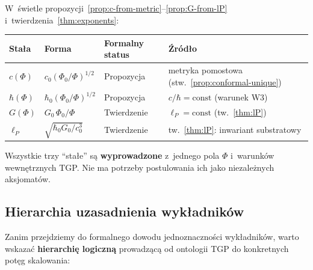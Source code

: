 \begin{remark}\label{rem:stalych-status}
W~\'swietle propozycji~\ref{prop:c-from-metric}--\ref{prop:G-from-lP}
i~twierdzenia~\ref{thm:exponents}:
\begin{center}\small
\begin{tabular}{@{}llll@{}}
\toprule
\textbf{Stała} & \textbf{Forma} & \textbf{Formalny status} & \textbf{Źródło} \\
\midrule
$c(\Phi)$ & $c_0(\Phi_0/\Phi)^{1/2}$ & Propozycja &
  metryka pomostowa (stw.~\ref{prop:conformal-unique}) \\
$\hbar(\Phi)$ & $\hbar_0(\Phi_0/\Phi)^{1/2}$ & Propozycja &
  $c/\hbar = \mathrm{const}$ (warunek W3) \\
$G(\Phi)$ & $G_0\,\Phi_0/\Phi$ & Twierdzenie &
  $\ell_P = \mathrm{const}$ (tw.~\ref{thm:lP}) \\
$\ell_P$ & $\sqrt{\hbar_0 G_0/c_0^3}$ & Twierdzenie &
  tw.~\ref{thm:lP}: inwariant substratowy \\
\bottomrule
\end{tabular}
\end{center}
Wszystkie trzy ``sta\l{}e'' s\k{a} \textbf{wyprowadzone} z~jednego pola $\Phi$
i~warunków wewn\k{e}trznych TGP. Nie ma potrzeby postulowania ich
jako niezale\.znych aksjomat\'ow.
\end{remark}

\subsection{Hierarchia uzasadnienia wyk\l{}adnik\'ow}\label{ssec:hierarchia-uzasad}

Zanim przejdziemy do formalnego dowodu jednoznaczno\'sci
wyk\l{}adnik\'ow, warto wskaza\'c \textbf{hierarchi\k{e} logiczn\k{a}}
prowadz\k{a}c\k{a} od ontologii TGP do konkretnych pot\k{e}g
skalowania:

